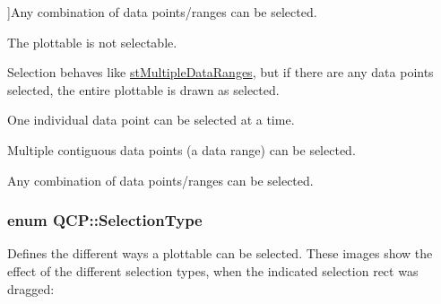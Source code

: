 \begin{Desc}
\begin{description}
{}]Any combination of data points/ranges can be selected. \item[{\em 
st\+None\hypertarget{namespace_q_c_p_ac6cb9db26a564b27feda362a438db038a2cb7996ccc6c39b9e6d20f2e46bf3f57}{}\label{namespace_q_c_p_ac6cb9db26a564b27feda362a438db038a2cb7996ccc6c39b9e6d20f2e46bf3f57}
}]The plottable is not selectable. \item[{\em 
st\+Whole\hypertarget{namespace_q_c_p_ac6cb9db26a564b27feda362a438db038a70734549f1745196a5b3ae8b8d158d52}{}\label{namespace_q_c_p_ac6cb9db26a564b27feda362a438db038a70734549f1745196a5b3ae8b8d158d52}
}]Selection behaves like \hyperlink{namespace_q_c_p_ac6cb9db26a564b27feda362a438db038ab68af6f04366b667f30f3bf1276eaf4f}{st\+Multiple\+Data\+Ranges}, but if there are any data points selected, the entire plottable is drawn as selected. \item[{\em 
st\+Single\+Data\hypertarget{namespace_q_c_p_ac6cb9db26a564b27feda362a438db038a83873962d48d31fa01ac36f859c00f67}{}\label{namespace_q_c_p_ac6cb9db26a564b27feda362a438db038a83873962d48d31fa01ac36f859c00f67}
}]One individual data point can be selected at a time. \item[{\em 
st\+Data\+Range\hypertarget{namespace_q_c_p_ac6cb9db26a564b27feda362a438db038a1db42782cc5852ace37e61244df1b7ad}{}\label{namespace_q_c_p_ac6cb9db26a564b27feda362a438db038a1db42782cc5852ace37e61244df1b7ad}
}]Multiple contiguous data points (a data range) can be selected. \item[{\em 
st\+Multiple\+Data\+Ranges\hypertarget{namespace_q_c_p_ac6cb9db26a564b27feda362a438db038ab68af6f04366b667f30f3bf1276eaf4f}{}\label{namespace_q_c_p_ac6cb9db26a564b27feda362a438db038ab68af6f04366b667f30f3bf1276eaf4f}
}]Any combination of data points/ranges can be selected. \end{description}
\end{Desc}
\subsubsection[{\texorpdfstring{Selection\+Type}{SelectionType}}]{\setlength{\rightskip}{0pt plus 5cm}enum {\bf Q\+C\+P\+::\+Selection\+Type}}\hypertarget{namespace_q_c_p_ac6cb9db26a564b27feda362a438db038}{}\label{namespace_q_c_p_ac6cb9db26a564b27feda362a438db038}
Defines the different ways a plottable can be selected. These images show the effect of the different selection types, when the indicated selection rect was dragged\+:

